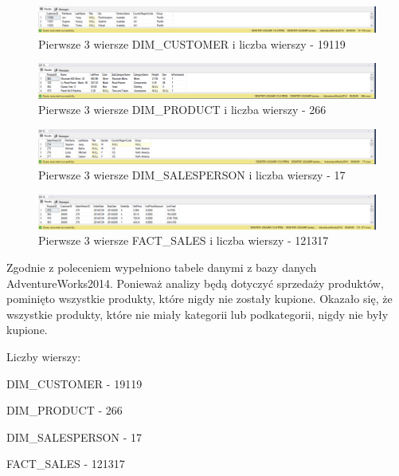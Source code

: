 \documentclass[a4paper,12pt]{article}
\begin{document}
\begin{figure}[H]
    \centering
    \includegraphics[width=1.0\textwidth]{images/3_customers.png}
    \caption{Pierwsze 3 wiersze DIM\_CUSTOMER i liczba wierszy - 19119}
\end{figure}

\begin{figure}[H]
    \centering
    \includegraphics[width=1.0\textwidth]{images/3_products.png}
    \caption{Pierwsze 3 wiersze DIM\_PRODUCT i liczba wierszy - 266}
\end{figure}

\begin{figure}[H]
    \centering
    \includegraphics[width=1.0\textwidth]{images/3_sale_people.png}
    \caption{Pierwsze 3 wiersze DIM\_SALESPERSON i liczba wierszy - 17}
\end{figure}

\begin{figure}[H]
    \centering
    \includegraphics[width=1.0\textwidth]{images/3_sales.png}
    \caption{Pierwsze 3 wiersze FACT\_SALES i liczba wierszy - 121317}
\end{figure}

Zgodnie z poleceniem wypełniono tabele danymi z bazy danych AdventureWorks2014. Ponieważ analizy będą dotyczyć sprzedaży produktów, pominięto wszystkie produkty, które nigdy nie zostały kupione. Okazało się, że wszystkie produkty, które nie miały kategorii lub podkategorii, nigdy nie były kupione.

Liczby wierszy:

DIM\_CUSTOMER - 19119

DIM\_PRODUCT - 266

DIM\_SALESPERSON - 17

FACT\_SALES - 121317
\end{document}
